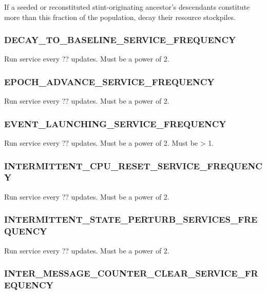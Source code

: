 If a seeded or reconstituted stint-originating ancestor's descendants constitute more than this fraction of the population, decay their resource stockpiles.

\subsubsection{DECAY\_TO\_BASELINE\_SERVICE\_FREQUENCY}


Run service every ?? updates.
                                                                                                        Must be a power of 2.

\subsubsection{EPOCH\_ADVANCE\_SERVICE\_FREQUENCY}


Run service every ?? updates.
Must be a power of 2.

\subsubsection{EVENT\_LAUNCHING\_SERVICE\_FREQUENCY}


Run service every ?? updates.
Must be a power of 2.
Must be > 1.

\subsubsection{INTERMITTENT\_CPU\_RESET\_SERVICE\_FREQUENCY}


Run service every ?? updates.
Must be a power of 2.

\subsubsection{INTERMITTENT\_STATE\_PERTURB\_SERVICES\_FREQUENCY}


Run service every ?? updates.
Must be a power of 2.

\subsubsection{INTER\_MESSAGE\_COUNTER\_CLEAR\_SERVICE\_FREQUENCY}

